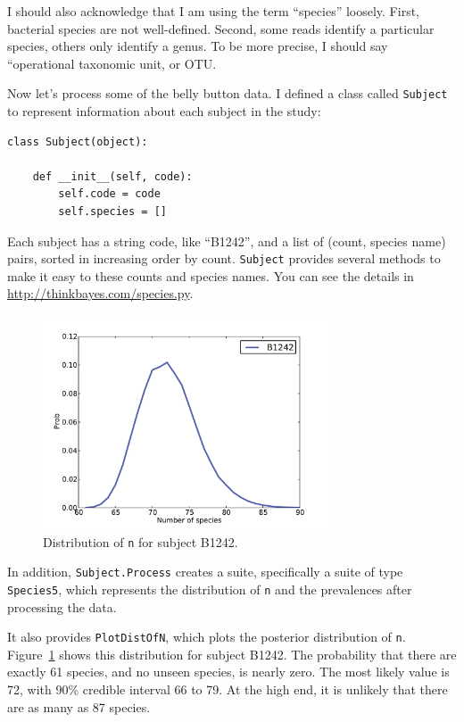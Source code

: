\documentclass[12pt]{book}
\begin{document}
I should also acknowledge that I am using the term ``species''
loosely.  First, bacterial species are not well-defined.  Second,
some reads identify a particular species, others only identify
a genus.  To be more precise, I should say ``operational
taxonomic unit, or OTU.

Now let's process some of the belly button data.  I defined
a class called {\tt Subject} to represent information about
each subject in the study:

\begin{verbatim}
class Subject(object):

    def __init__(self, code):
        self.code = code
        self.species = []
\end{verbatim}

Each subject has a string code, like ``B1242'', and a list of
(count, species name) pairs, sorted in increasing order by count.
{\tt Subject} provides several methods to make it
easy to these counts and species names.  You can see the details
in \url{http://thinkbayes.com/species.py}.

\begin{figure}
\centerline{\includegraphics[height=2.5in]{figs/species-ndist-B1242.pdf}}
\caption{Distribution of {\tt n} for subject B1242.}
\label{species-ndist}
\end{figure}

In addition, {\tt Subject.Process} creates a suite, specifically
a suite of type {\tt Species5}, which represents the distribution
of {\tt n} and the prevalences after processing the data.

It also provides {\tt PlotDistOfN}, which plots the posterior
distribution of {\tt n}.  Figure~\ref{species-ndist} shows this
distribution for subject B1242.
The probability that there are exactly 61
species, and no unseen
species, is nearly zero.  The most likely value is 72,
with 90\% credible interval 66 to 79.  At the high end, it is
unlikely that there are as many as 87 species.
\end{document}
